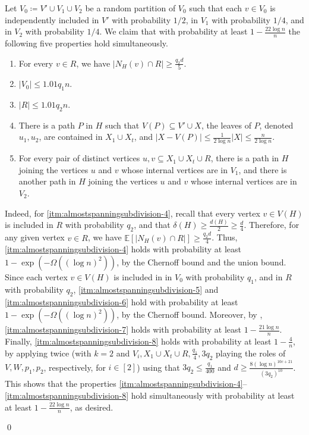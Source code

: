 \documentclass[10pt]{article}
\theoremstyle{plain}
\numberwithin{theorem}{section}
\theoremstyle{definition}
\theoremstyle{remark}
\renewenvironment{proof}[1][]{\begin{trivlist}
\item[\hspace{\labelsep}{\bf\noindent Proof#1.\/}] }{\qed\end{trivlist}}
\renewcommand{\setminus}{-}
\theoremstyle{plain}
\begin{document}
\begin{proof}[ of Lemma~\ref{lem:almostspannningtopological}]
Let $V_0 \coloneqq V' \cup V_1 \cup V_2$ be a random partition of $V_0$ such that each $v \in V_0$ is independently included in $V'$ with probability $1/2$, in $V_1$ with probability $1/4$, and in $V_2$ with probability $1/4$.
		We claim that with probability at least $1 - \frac{22\log n}{n}$ the following five properties hold simultaneously.
		\begin{enumerate}[label = \rm(S\arabic*)]
			\item \label{itm:almostspanningsubdivision-4}
				For every $v \in R$, we have $|N_H(v) \cap R| \ge \frac{q_2 d}{5}$.
			\item \label{itm:almostspanningsubdivision-5}
				$|V_0| \le 1.01 q_1n$.
			\item \label{itm:almostspanningsubdivision-6}
				$|R| \le 1.01 q_2n$.
			\item \label{itm:almostspanningsubdivision-7}
				There is a path $P$ in $H$ such that $V(P) \subseteq V' \cup X$, the leaves of $P$, denoted $u_1, u_2$, are contained in $X_1 \cup X_t$, and $|X \setminus V(P)| \le \frac{1}{2\log n}|X| \le \frac{n}{2\log n}$.
			\item \label{itm:almostspanningsubdivision-8}
    For every pair of distinct vertices $u, v \subseteq X_1 \cup X_t \cup R$, there is a path in $H$ joining the vertices $u$ and $v$ whose internal vertices are in $V_1$, and there is another path in $H$ joining the vertices $u$ and $v$ whose internal vertices are in $V_2$. 
		\end{enumerate}
		Indeed, for \ref{itm:almostspanningsubdivision-4}, recall that every vertex $v \in V(H)$ is included in $R$ with probability $q_2$, and that $\delta(H) \ge \frac{d(H)}{2} \ge \frac{d}{4}$.
		Therefore, for any given vertex $v \in R$, we have $\mathbb{E}[|N_H(v) \cap R|] \ge \frac{q_2 d}{4}$. Thus, \ref{itm:almostspanningsubdivision-4} holds with probability at least $1 - \exp\left(-\Omega\left((\log n)^{2}\right)\right)$, by the Chernoff bound and the union bound.
        Since each vertex $v \in V(H)$ is included in in $V_0$ with probability $q_1$, and in $R$ with probability $q_2$, \ref{itm:almostspanningsubdivision-5} and \ref{itm:almostspanningsubdivision-6} hold with probability at least $1 - \exp\left(-\Omega\left((\log n)^{2}\right)\right)$, by the Chernoff bound. 
		Moreover, by , \ref{itm:almostspanningsubdivision-7} holds with probability at least $1 - \frac{21\log n}{n}$. Finally, \ref{itm:almostspanningsubdivision-8} holds with probability at least $1 - \frac{4}{n}$, by applying  twice (with $k = 2$ and $V_i, X_1 \cup X_t \cup R, \frac{q_1}{4}, 3q_2$ playing the roles of $V, W, p_1, p_2$, respectively, for $i \in [2]$) using that $3q_2 \le \frac{q_1}{400}$ and $d \ge \frac{8 (\log n)^{10c+21}}{(3q_2)^{10}}$. This shows that the properties \ref{itm:almostspanningsubdivision-4}--\ref{itm:almostspanningsubdivision-8} hold simultaneously with probability at least at least $1 - \frac{22\log n}{n}$, as desired.


\end{proof}
\end{document}
